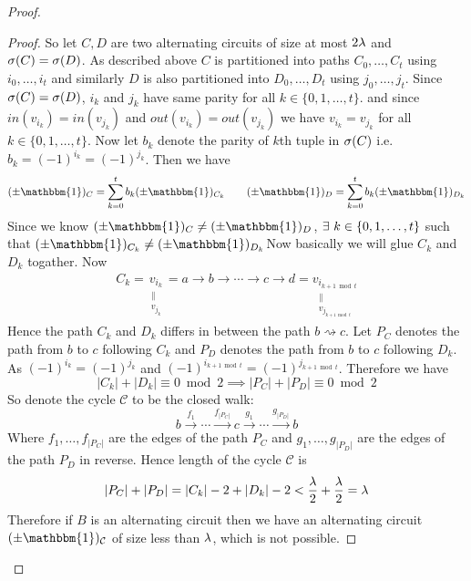\begin{proof}
	\begin{proof}
		So let $C,D$ are two alternating circuits of size at most $2\lambda$ and $\sigma(C)=\sigma(D)$. As described above $C$ is partitioned into paths $C_0,\dots, C_t$ using $i_0,\dots, i_t$ and similarly $D$ is also partitioned into $D_0,\dots, D_t$ using $j_0,\dots, j_t$. Since $\sigma(C)=\sigma(D)$, $i_k$ and $j_k$ have same parity for all $k\in\{0,1,\dots, t \}$. and since $in(v_{i_k})=in(v_{j_k})$ and $out(v_{i_k})=out(v_{j_k})$ we have $v_{i_k}=v_{j_k}$ for all $k\in \{0,1,\dots, t\}$. Now let $b_k$ denote the parity of $k$th tuple in $\sigma(C)$ i.e. $b_k=(-1)^{i_k}=(-1)^{j_k}$. Then we have \[
			(\pm\mathbbm{1} )_C=\sum\limits_{k=0}^{t} b_k(\pm\mathbbm{1} )_{C_k}\qquad (\pm\mathbbm{1} )_D=\sum\limits_{k=0}^{t } b_k(\pm\mathbbm{1} )_{D_k }
		\]Since we know $(\pm\mathbbm{1} )_{C}\neq (\pm \mathbbm{1} )_D$, $\exs\ k\in \{0,1,\dots, t\}	$ such that $(\pm\mathbbm{1} )_{C_k}\neq (\pm\mathbbm{1} )_{D_k}$Now basically we will glue $C_k$ and $D_k$ togather. Now \begin{align*}
			C_k = \underset{\substack{\parallel \\ v_{j_k}}}{v_{i_k}}  = a\to b\to \cdots \to c\to d=\underset{\substack{\parallel \\ v_{j_{k+1\bmod t}}}}{v_{i_{k+1\bmod t}}}
		\end{align*}
		Hence the path $C_k$ and $D_k$ differs in between the path $b\rightsquigarrow c$. Let $P_C$ denotes the path from $b$ to $c$ following $C_k$ and $P_D$ denotes the path from $b$ to $c$ following $D_k$. As $(-1)^{i_k}=(-1)^{j_k}$ and $(-1)^{i_{k+1\bmod t}}=(-1)^{j_{k+1\bmod t}}$. Therefore we have \[
			|C_k|+|D_k|\equiv 0\bmod 2\implies |P_C|+|P_D|\equiv 0\bmod 2
		\]
		So denote the cycle $\mathcal{C}$ to be the closed walk: $$b\overset{f_1}{\longrightarrow} \cdots \overset{f_{|P_C|}}{\longrightarrow} c\overset{g_1}{\longrightarrow} \cdots \overset{g_{|P_D|}}{\longrightarrow} b$$ Where $f_1,\dots, f_{|P_C|}$ are the edges of the path $P_C$ and $g_1,\dots, g_{|P_D|}$ are the edges of the path $P_D$ in reverse. Hence length of the cycle $\mathcal{C } $ is $$|P_C|+|P_D|=|C_k|-2+|D_k|-2<\frac{\lambda}2+\frac{\lambda}2=\lambda$$Therefore if $B$ is an alternating circuit then we have an alternating circuit $(\pm\mathbbm{1}  )_{\mathcal{C} }$ of size less than $\lambda$, which is not possible.
	

\end{proof}
\end{proof}
